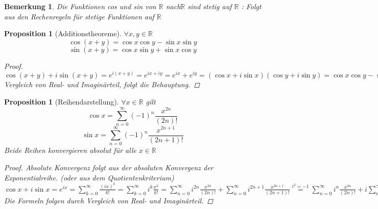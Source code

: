 \documentclass[a4paper,titlepage,oneside]{article}
\def\R{\ensuremath{\mathbb{R}} }
\def\im{\ensuremath{\mathit{i}} }
\def\e{\ensuremath{\mathit{e}} }
\newcommand{\suminf}[2][n]{\ensuremath{\sum_{#1= 0}^{\infty}{#2}}}
\theoremstyle{thmstyle}
\newtheorem{prop}[satz]{Proposition}
\newtheorem{bem}[satz]{Bemerkung}
\theoremstyle{subthmstyle}
\begin{document}
\begin{bem}
Die Funktionen cos und sin von \R nach\R sind stetig auf \R:
Folgt aus den Rechenregeln für stetige Funktionen auf \R
\end{bem}

\begin{prop}[Additionstheoreme]
$\forall x,y \in \R$
\[ \cos (x + y) = \cos x \cos y - \sin x \sin y\]
\[ \sin (x + y) = \cos x \sin y + \sin x \cos y \]
\begin{proof}
$\cos (x + y) + \im \sin (x + y) = \e^{\im(x+y)} = \e^{\im x + \im y} = \e^{\im x} + \e^{\im y} = (\cos x + \im \sin x) (\cos y + \im \sin y) = \cos x \cos y - \sin x \sin y + \im(\cos x \sin y + \sin x \cos y) $ Vergleich von Real- und Imaginärteil, folgt die Behauptung.
\end{proof}
\end{prop}

\begin{prop}[Reihendarstellung]
$\forall x \in \R $ gilt
\[\cos x = \suminf{(-1)^n \frac{x^{2n}}{(2n)!}}\]
\[\sin x = \suminf{(-1)^n \frac{x^{2n+1}}{(2n+1)!}}\]
Beide Reihen konvergieren absolut für alle $ x \in \R$
\begin{proof}
Absolute Konvergenz folgt aus der absoluten Konvergenz der Exponentialreihe. (oder aus dem Quotientenkriterium)\\
$\cos x + \im \sin x = \e^{\im x} = \suminf[k]{\frac{(\im x)^k}{k!}} = \suminf[k]{\im^k\frac{x^k}{k!}} = \suminf{\im^{2n} \frac{x^{2n}}{(2n)!}} + \suminf{\im^{2n+1} \frac{x^{2n+1}}{(2n+1)!}}  \overset{\im^2 = -1}{=} \suminf{\im^{n} \frac{x^{2n}}{(2n)!}} + \im \suminf{\im^{n} \frac{x^{2n+1}}{(2n+1)!}}$\\
Die Formeln folgen durch Vergleich von Real- und Imaginärteil.
\end{proof}
\end{prop}
\end{document}
